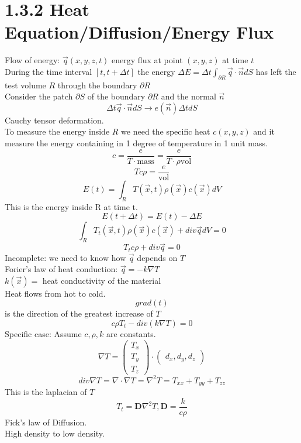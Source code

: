 \documentclass{article}
\begin{document}
\section*{1.3.2 Heat Equation/Diffusion/Energy Flux}
Flow of energy: $\vec{q}(x,y,z,t)$ energy flux at point $(x,y,z)$ at time $t$\\
During the time interval $[t, t+ \Delta t]$ the energy $\Delta E = \Delta t \int_{\partial R} \vec{q} \cdot \vec{n} dS$ has left the test volume $R$ through the boundary $\partial R$\\
Consider the patch $\partial S$ of the boundary $\partial R$ and the normal $\vec{n}$\\
$$\Delta t \vec{q} \cdot \vec{n} dS \rightarrow e(\vec{n}) \Delta t dS$$
Cauchy tensor deformation.\\
To measure the energy inside $R$ we need the specific heat $c(x,y,z)$ and it measure the energy containing in 1 degree of temperature in 1 unit mass.\\
$$ c = \frac{e}{T \cdot \text{mass}} = \frac{e}{T \cdot \rho \text{vol}}$$ 
$$ T c \rho = \frac{e}{\text{vol}}$$
$$ E(t) = \int_{R} T(\vec{x},t) \rho(\vec{x}) c(\vec{x}) dV $$ 
This is the energy inside R at time t.\\
$$E(t + \Delta t) = E(t) - \Delta E$$
$$\int_{R} T_t(\vec{x},t) \rho(\vec{x}) c(\vec{x}) + div \vec{q} dV = 0$$
$$ T_t c \rho + div \vec{q} = 0$$
Incomplete: we need to know how $\vec{q}$ depends on $T$\\
Forier's law of heat conduction: $\vec{q} = -k \nabla T$\\
$k(\vec{x}) = $ heat conductivity of the material\\
Heat flows from hot to cold.\\
$$grad(t) $$ is the direction of the greatest increase of $T$\\
$$c \rho T_t - div(k \nabla T) = 0$$
Specific case: Assume $c, \rho, k$ are constants.\\
$$\nabla T = \begin{pmatrix} T_x \\ T_y \\ T_z \end{pmatrix} \cdot \begin{pmatrix}
    d_x, d_y, d_z
\end{pmatrix}$$
$$ div \nabla T = \nabla \cdot \nabla T = \nabla^2 T = T_{xx} + T_{yy} + T_{zz}$$
This is the laplacian of $T$\\
$$T_t = \mathbf{D} \nabla^2 T, \mathbf{D} = \frac{k}{c \rho}$$
Fick's law of Diffusion.\\
High density to low density.\\
\end{document}
